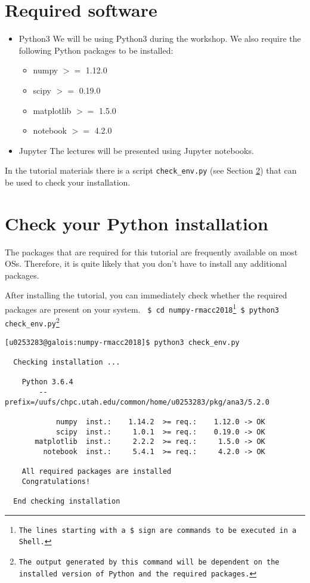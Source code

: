 \documentclass[11pt]{article}
\begin{document}
\section{Required software}
\begin{itemize}
  \item Python$3$ \newline
        We will be using Python$3$ during the workshop.
        We also require the following Python packages to be installed:
        \begin{itemize}
           \item numpy $>=$ 1.12.0 
           \item scipy $>=$ 0.19.0
           \item matplotlib $>=$ 1.5.0
           \item notebook $>=$ 4.2.0
        \end{itemize} 

  \item Jupyter \newline
        The lectures will be presented using Jupyter notebooks.
\end{itemize}

In the tutorial materials there is a script \texttt{check\_env.py} 
(see Section \ref{section:check}) that can be used to check your installation.


\section{Check your Python installation}\label{section:check}
The packages that are required for this tutorial are frequently available 
on most OSs.
Therefore, it is quite likely that you don't have to install any additional packages.

After installing the tutorial, you can immediately check whether the required packages 
are present on your system. \newline\newline
\texttt{
\$ cd numpy-rmacc2018\footnote{The lines starting with a \$ sign are commands to be executed in a Shell.} \newline
\$ python3 check\_env.py\footnote{The output generated by this command will be dependent on the installed version of Python and the required packages.}\newline
}
\begin{verbatim}
[u0253283@galois:numpy-rmacc2018]$ python3 check_env.py

  Checking installation ...

    Python 3.6.4
        --prefix=/uufs/chpc.utah.edu/common/home/u0253283/pkg/ana3/5.2.0

            numpy  inst.:    1.14.2  >= req.:    1.12.0 -> OK 
            scipy  inst.:     1.0.1  >= req.:    0.19.0 -> OK 
       matplotlib  inst.:     2.2.2  >= req.:     1.5.0 -> OK 
         notebook  inst.:     5.4.1  >= req.:     4.2.0 -> OK 

    All required packages are installed
    Congratulations!

  End checking installation

\end{verbatim}
\end{document}
